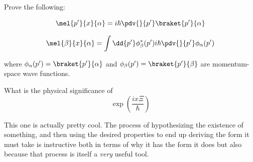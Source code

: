 \begin{question}

  \begin{questionpart}
    Prove the following:

    \begin{questionsubpart}
      \begin{equation*}
        \mel{p'}{x}{\alpha} = i\hbar \pdv{}{p'}\braket{p'}{\alpha}
      \end{equation*}
    \end{questionsubpart}

    \begin{questionsubpart}
      \begin{equation*}
        \mel{\beta}{x}{\alpha} = \int \dd{p'} \phi_{\beta}^{*}(p')i \hbar \pdv{}{p'} \phi_{\alpha}(p')
      \end{equation*}
    \end{questionsubpart}

    where $\phi_{\alpha}(p') = \braket{p'}{\alpha}$ and
    $\phi_{\beta}(p') = \braket{p'}{\beta}$ are momentum-space wave
    functions.
  \end{questionpart}

  \begin{questionpart}
    What is the physical significance of
    \begin{equation*}
      \exp(\frac{ix\Xi}{\hbar})
    \end{equation*}
  \end{questionpart}

\end{question}

\begin{purpose}
  This one is actually pretty cool.  The process of hypothesizing the
  existence of something, and then using the desired properties to end
  up deriving the form it must take is instructive both in terms of
  why it has the form it does but also because that process is itself
  a \emph{very} useful tool.
\end{purpose}

